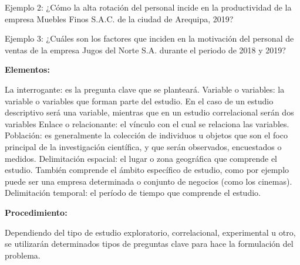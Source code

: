 Ejemplo 2: ¿Cómo la alta rotación del personal incide en la productividad de la empresa Muebles Finos S.A.C. de la ciudad de Arequipa, 2019?

Ejemplo 3: ¿Cuáles son los factores que inciden en la motivación del personal de ventas de la empresa Jugos del Norte S.A. durante el periodo de 2018 y 2019?

\textbf{Elementos:}

La interrogante: es la pregunta clave que se planteará.
Variable o variables: la variable o variables que forman parte del estudio. En el caso de un estudio descriptivo será una variable, mientras que en un estudio correlacional serán dos variables
Enlace o relacionante: el vínculo con el cual se relaciona las variables.
Población: es generalmente la colección de individuos u objetos que son el foco principal de la investigación científica, y que serán observados, encuestados o medidos.
Delimitación espacial: el lugar o zona geográfica que comprende el estudio. También comprende el ámbito específico de estudio, como por ejemplo puede ser una empresa determinada o conjunto de negocios (como los cinemas).
Delimitación temporal: el período de tiempo que comprende el estudio.


\textbf{Procedimiento:}

Dependiendo del tipo de estudio exploratorio, correlacional, experimental u otro, se utilizarán determinados tipos de preguntas clave para hace la formulación del problema.
